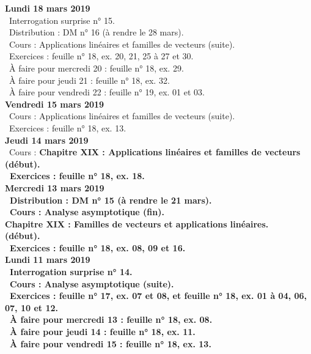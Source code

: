 \documentclass[12pt,a4paper]{article}
\begin{document}
\noindent\textbf{\bf Lundi 18 mars 2019} \\
\bu\ Interrogation surprise n° 15.\\
\bu\ Distribution : DM n° 16 (à rendre le 28 mars).\\
\bu\ Cours : Applications linéaires et familles de vecteurs (suite).\\
\bu\ Exercices : feuille n° 18, ex. 20, 21, 25 à 27 et 30.\\
\bu\ À faire pour mercredi 20 : feuille n° 18, ex. 29.\\
\bu\ À faire pour jeudi 21 : feuille n° 18, ex. 32.\\
\bu\ À faire pour vendredi 22 : feuille n° 19, ex. 01 et 03.\vspace{.4cm}\\

\noindent\textbf{\bf Vendredi 15 mars 2019} \\
\bu\ Cours : Applications linéaires et familles de vecteurs (suite).\\
\bu\ Exercices : feuille n° 18, ex. 13.\vspace{.4cm}\\

\noindent\textbf{Jeudi 14 mars 2019}\\
\bu\ Cours : \bf Chapitre XIX \rm : Applications linéaires et familles de vecteurs (début).\\
\bu\ Exercices : feuille n° 18, ex. 18.\vspace{.4cm}\\

\noindent\textbf{Mercredi 13 mars 2019} \\
\bu\ Distribution : DM n° 15 (à rendre le 21 mars).\\
\bu\ Cours : Analyse asymptotique (fin).\\
\bf Chapitre XIX \rm : Familles de vecteurs et applications linéaires.\\ 
(début).\\
\bu\ Exercices : feuille n° 18, ex. 08, 09 et 16.\vspace{.4cm}\\

\noindent\textbf{\bf Lundi 11 mars 2019} \\
\bu\ Interrogation surprise n° 14.\\
\bu\ Cours : Analyse asymptotique (suite).\\
\bu\ Exercices : feuille n° 17, ex. 07 et 08, et feuille n° 18, ex. 01 à 04, 06, 07, 10 et 12.\\
\bu\ À faire pour mercredi 13 : feuille n° 18, ex. 08.\\
\bu\ À faire pour jeudi 14 : feuille n° 18, ex. 11.\\
\bu\ À faire pour vendredi 15 : feuille n° 18, ex. 13.\vspace{.4cm}\\
\end{document}
